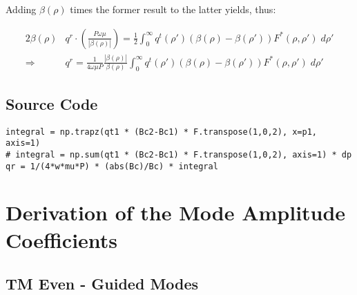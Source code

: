 \documentclass[11pt, oneside]{article}   	%
\begin{document}
\noindent

Adding $\beta (\rho)$ times the former result to the latter yields, thus:

\begin{align}
2 \beta(\rho) &q^{r} \cdot \left( \frac{P \omega \mu}{|\beta(\rho)|} \right) = \frac{1}{2} \int_{0}^{\infty} q^{t} (\rho ') (\beta (\rho) - \beta(\rho ')) F^{*}(\rho, \rho ') \; d\rho' \nonumber \\
\Rightarrow \; &q^{r} = \frac{1}{4 \omega \mu P} \frac{|\beta(\rho)|}{\beta(\rho)} \int_{0}^{\infty} q^{t} (\rho ') (\beta (\rho) - \beta(\rho ')) F^{*}(\rho, \rho ') \; d\rho'
\end{align}

\subsection{Source Code}

\begin{lstlisting}
integral = np.trapz(qt1 * (Bc2-Bc1) * F.transpose(1,0,2), x=p1, axis=1)
# integral = np.sum(qt1 * (Bc2-Bc1) * F.transpose(1,0,2), axis=1) * dp
qr = 1/(4*w*mu*P) * (abs(Bc)/Bc) * integral
\end{lstlisting}






\newpage

\section{Derivation of the Mode Amplitude Coefficients}
\label{sec:coefficients}

\subsection{TM Even - Guided Modes}
\end{document}
